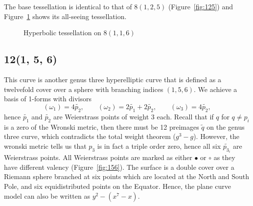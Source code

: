 \documentclass[12pt,reqno]{amsart}
\theoremstyle{definition}
\theoremstyle{remark}
\begin{document}
The base tessellation is identical to that of $8(1,2,5)$ (Figure~\ref{fig:125}) and Figure~\ref{fig:116} shows its all-seeing tessellation. 

\begin{figure}[htbp]
    \centering
    \caption{Hyperbolic tessellation on $8(1, 1, 6)$}%
    \label{fig:116}%
\end{figure}




\subsection*{12(1, 5, 6)}
This curve is another genus three hyperelliptic curve that is defined as a twelvefold cover over a sphere with branching indices $(1, 5, 6).$ We achieve a basis of 1-forms with divisors $$(\omega_1) = 4 \widetilde{p_2}, \qquad (\omega_2) = 2 \widetilde{p_1} + 2 \widetilde{p_2}, \qquad (\omega_3) = 4 \widetilde{p_2},$$ hence $\widetilde{p_1}$ and $\widetilde{p_2}$ are Weierstrass points of weight 3 each. Recall that if $q$ for $q \neq p_i$ is a zero of the Wronski metric, then there must be 12 preimages $\widetilde{q}$ on the genus three curve, which contradicts the total weight theorem ($g^3 - g$). However, the wronski metric tells us that $p_3$ is in fact a triple order zero, hence all six $\widetilde{p_{3_i}}$ are Weierstrass points. All Weierstrass points are marked as either $\bullet$ or $\circ$ as they have different valency (Figure~\ref{fig:156}). The surface is a double cover over a Riemann sphere branched at six points which are located at the North and South Pole, and six equidistributed points on the Equator. Hence, the plane curve model can also be written as $y^2 - (x^7 - x).$
\end{document}
